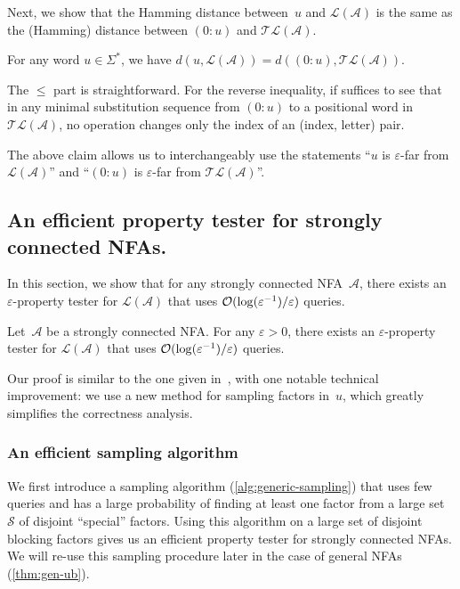 \documentclass[letterpaper, USenglish, cleveref, autoref, thm-restate, numberwithinsect]{lipics-v2021}
\theoremstyle{theorem}
\theoremstyle{definition}
\newcommand{\Aa}{\mathcal{A}}
\newcommand{\cO}{\mathcal{O}}
\newcommand{\eps}{\varepsilon}
\newcommand{\lang}[1]{\mathcal{L}(#1)}
\newcommand{\Ss}{\mathcal{S}}
\newcommand{\timedlang}[1]{\mathcal{TL}( #1 )}
\newcommand{\timedword}[2]{(#1:#2)}
\newcommand{\twu}{\timedword{0}{u}}
\newcommand{\epslogeps}[1][]
{\ifthenelse{\equal{#1}{}}{\log(\eps^{-1})/\eps}{\log^{ #1 }(\eps^{-1})/\eps}}
\begin{document}
Next, we show that the Hamming distance between~$u$ and $\lang{\Aa}$ is the same as the (Hamming) distance between $\twu$ and $\timedlang{\Aa}$.
\begin{claim}\label{claim:far-equiv}
    For any word $u\in\Sigma^*$, we have $d(u, \lang{\Aa}) = d(\twu, \timedlang{\Aa})$.
\end{claim}
\begin{claimproof}
    The $\le$ part is straightforward.
    For the reverse inequality, if suffices to see that in any minimal substitution sequence from $\twu$
    to a positional word in $\timedlang{\Aa}$, no operation changes only the index of an (index, letter) pair.
\end{claimproof}
The above claim allows us to interchangeably use the statements ``$u$ is $\eps$-far from $\lang{\Aa}$'' and ``$\twu$ is $\eps$-far from $\timedlang{\Aa}$''.

\subsection{An efficient property tester for strongly connected NFAs.}\label{sec:scc-ub}
In this section, we show that for any strongly connected NFA~$\Aa$, there exists an $\eps$-property tester for $\lang{\Aa}$ that uses $\cO(\epslogeps)$ queries.
\begin{theorem}\label{thm:generic-tester-scc}
    Let~$\Aa$ be a strongly connected NFA.
    For any $\eps > 0$, there exists an $\eps$-property tester for $\lang{\Aa}$
    that uses $\cO(\epslogeps)$ queries. 
\end{theorem}

Our proof is similar to the one given in~\cite{bathie2021property}, with one notable technical improvement: we use a new method for sampling factors in~$u$, which greatly simplifies the correctness analysis.

\subsubsection{An efficient sampling algorithm}

We first introduce a sampling algorithm (\cref{alg:generic-sampling}) that uses few queries and has a large probability of finding at least one factor from a large set $\Ss$ of disjoint ``special'' factors.
Using this algorithm on a large set of disjoint blocking factors gives us an efficient property tester for strongly connected NFAs. We will re-use this sampling procedure later in the case of general NFAs (\cref{thm:gen-ub}).  
\end{document}

